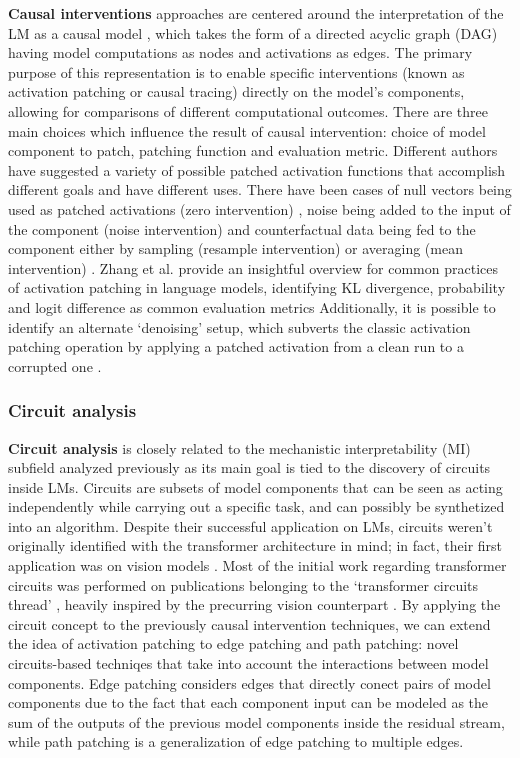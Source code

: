 \textbf{Causal interventions} approaches are centered around the interpretation of the LM as a causal model , which takes the form of a directed acyclic graph (DAG) having model computations as nodes and activations as edges.
The primary purpose of this representation is to enable specific interventions (known as activation patching or causal tracing) directly on the model's components, allowing for comparisons of different computational outcomes.
There are three main choices which influence the result of causal intervention: choice of model component to patch, patching function and evaluation metric.
Different authors have suggested a variety of possible patched activation functions that accomplish different goals and have different uses.
There have been cases of null vectors being used as patched activations (zero intervention) , noise being added to the input of the component (noise intervention)  and counterfactual data being fed to the component either by sampling (resample intervention)  or averaging (mean intervention) .
Zhang et al. provide an insightful overview for common practices of activation patching in language models, identifying KL divergence, probability and logit difference as common evaluation metrics 
Additionally, it is possible to identify an alternate `denoising' setup, which subverts the classic activation patching operation by applying a patched activation from a clean run to a corrupted one .


\subsubsection{Circuit analysis}

\textbf{Circuit analysis} is closely related to the mechanistic interpretability (MI) subfield analyzed previously as its main goal is tied to the discovery of circuits inside LMs.
Circuits are subsets of model components that can be seen as acting independently while carrying out a specific task, and can possibly be synthetized into an algorithm.
Despite their successful application on LMs, circuits weren't originally identified with the transformer architecture in mind; in fact, their first application was on vision models .
Most of the initial work regarding transformer circuits was performed on publications belonging to the `transformer circuits thread' , heavily inspired by the precurring vision counterpart .
By applying the circuit concept to the previously causal intervention techniques, we can extend the idea of activation patching to edge patching and path patching: novel circuits-based techniqes that take into account the interactions between model components.
Edge patching  considers edges that directly conect pairs of model components due to the fact that each component input can be modeled as the sum of the outputs of the previous model components inside the residual stream, while path patching  is a generalization of edge patching to multiple edges.

